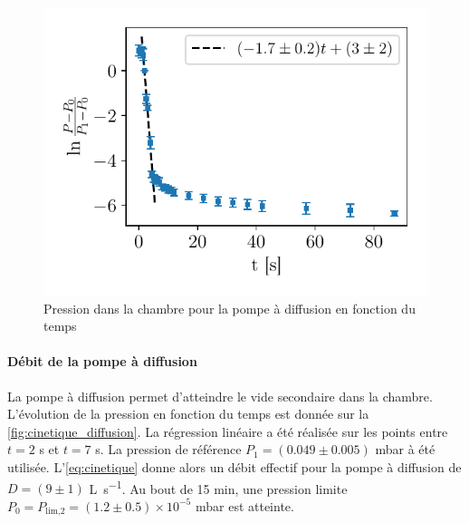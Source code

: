 \begin{minipage}{\textwidth}
    \begin{figure}
        \centering
        \includegraphics[width=\linewidth]{figures/cinetique_diffusion.pdf}
        \caption{Pression dans la chambre pour la pompe à diffusion en fonction du temps}
        \label{fig:cinetique_diffusion}
    \end{figure}
    
    \paragraph*{Débit de la pompe à diffusion}
    La pompe à diffusion permet d'atteindre le vide secondaire dans la chambre. L'évolution de la pression en fonction du temps est donnée sur la \autoref{fig:cinetique_diffusion}. La régression linéaire a été réalisée sur les points entre \(t = 2\) \si{\second} et \(t = 7\) \si{\second}. La pression de référence \(P_1 = (0.049 \pm 0.005)\) \si{\milli\bar} à été utilisée. L'\autoref{eq:cinetique} donne alors un débit effectif pour la pompe à diffusion de \(D = (9 \pm 1)\) \si{\liter \per \second}. Au bout de 15 \si{\minute}, une pression limite \(P_0 = P_\textrm{lim,2} = (1.2 \pm 0.5) \times 10^{-5}\) \si{\milli\bar} est atteinte.
\end{minipage}






 \\




